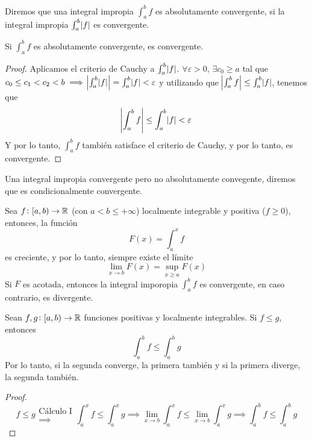 \begin{defi}
	Diremos que una integral impropia $\int^b_a f$ es absolutamente convergente,
	si la integral impropia $\int^b_a \abs{f}$ es convergente.
\end{defi}

\begin{prop}
	Si $\int^b_a f$ es absolutamente convergente, es convergente.
\end{prop}
\begin{proof}
	Aplicamos el criterio de Cauchy a $\int^b_a \abs{f}$. $\forall \varepsilon >0$,
	$\exists  c_0 \geq a$ tal que $c_0 \leq c_1 < c_2 < b \implies
	\abs{\int^b_a \abs{f}} = \int^b_a \abs{f} < \varepsilon$ y utilizando que 
	$\abs{\int^b_a f} \leq \int^b_a \abs{f}$, tenemos que
	\[
		\abs{\int^b_a f} \leq \int^b_a \abs{f} < \varepsilon
	\]
	Y por lo tanto, $\int^b_a f$ tambi\'en satisface el criterio de Cauchy, y por
	lo tanto, es convergente.
\end{proof}

\begin{defi}
	Una integral impropia convergente pero no absolutamente convegente, diremos que
	es condicionalmente convergente.
\end{defi}

\begin{prop}
	Sea $f \colon [a,b) \to \mathbb{R}$ (con $a < b \leq +\infty$) localmente integrable
	y positiva ($f \geq 0$), entonces, la función
	\[
		F(x) = \int^x_a f
	\]
	es creciente, y por lo tanto, siempre existe el límite
	\[
		\lim_{x \to b} F(x) = \sup_{x \geq a} F(x)
	\]
	Si $F$ es acotada, entonces la integral imporopia $\int^b_a f$ es convergente,
	en caso contrario, es divergente.
\end{prop}

\begin{prop}
	Sean $f,g \colon [a,b) \to \mathbb{R}$ funciones positivas y localmente integrables.
	Si $f \leq g$, entonces
	\[
		\int^b_a f \leq \int^b_a g
	\]
	Por lo tanto, si la segunda converge, la primera tambi\'en y si la primera 
	diverge, la segunda tambi\'en.
\end{prop}
\begin{proof}
	\[
		f \leq g \substack{\text{Cálculo I} \\ \implies}
		\int^x_a f \leq \int^x_a g \implies \lim_{x \to b} \int^x_a f \leq
		\lim_{x \to b} \int^x_a g \implies \int^b_a f \leq \int^b_a g
	\]
\end{proof}

